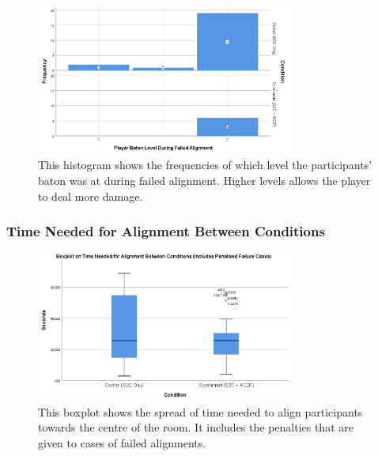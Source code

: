 \begin{figure}[tbph]
    \centering
    \includegraphics[width=0.75\textwidth]{figures/graphs/failureBatonLevelHistogram.png}
    \caption[Histogram on Player Baton Level During Failed Alignments]{This histogram shows the frequencies of which level the participants' baton was at during failed alignment. Higher levels allows the player to deal more damage.}
    \label{fig:ex2failedAlignmentBatonLevel}
\end{figure}

\subsubsection{Time Needed for Alignment Between Conditions}
\begin{figure}[tbph]
    \centering
    \includegraphics[width=0.75\textwidth]{figures/graphs/boxplotAlignmentTimesWithPenalties.png}
    \caption[Boxplot on Time Needed To Align Participants To Centre (Including Failure Penalties)]{This boxplot shows the spread of time needed to align participants towards the centre of the room. It includes the penalties that are given to cases of failed alignments.}
    \label{fig:alignmentTimesWithPenalties}
\end{figure}


